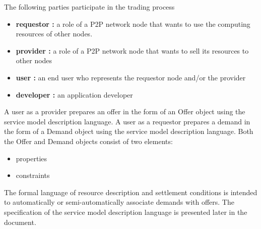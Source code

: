 The following parties participate in the trading process

\begin{itemize}
\item {\bf requestor :} a role of a P2P network node that wants to use the computing resources of other nodes.
\item {\bf provider :} a role of a P2P network node that wants to sell its resources to other nodes
\item {\bf user :} an end user who represents the requestor node and/or the provider
\item {\bf developer :} an application developer
\end{itemize}

A user as a provider prepares an offer in the form of an Offer object using the service model description language.
A user as a requestor prepares a demand in the form of a Demand object using the service model description language.
Both the Offer and Demand objects consist of two elements:

\begin{itemize}
\item properties
\item constraints
\end{itemize}

The formal language of resource description and settlement conditions is intended to automatically or semi-automatically associate demands with offers.
The specification of the service model description language is presented later in the document.

\newpage

